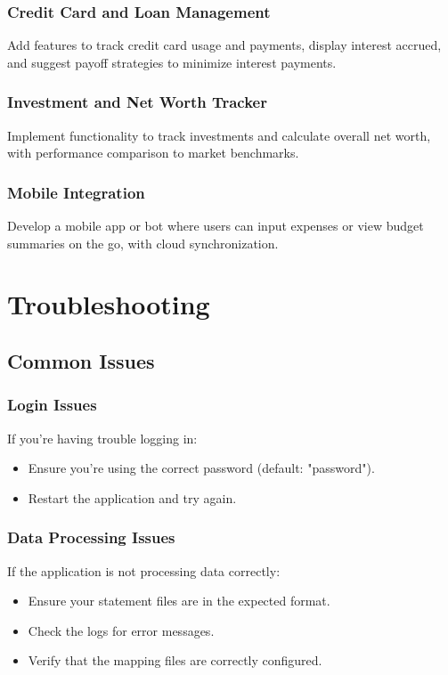 \documentclass[11pt,a4paper]{report}
\begin{document}
\subsection{Credit Card and Loan Management}
Add features to track credit card usage and payments, display interest accrued, and suggest payoff strategies to minimize interest payments.

\subsection{Investment and Net Worth Tracker}
Implement functionality to track investments and calculate overall net worth, with performance comparison to market benchmarks.

\subsection{Mobile Integration}
Develop a mobile app or bot where users can input expenses or view budget summaries on the go, with cloud synchronization.

\chapter{Troubleshooting}

\section{Common Issues}

\subsection{Login Issues}
If you're having trouble logging in:
\begin{itemize}
    \item Ensure you're using the correct password (default: "password").
    \item Restart the application and try again.
\end{itemize}

\subsection{Data Processing Issues}
If the application is not processing data correctly:
\begin{itemize}
    \item Ensure your statement files are in the expected format.
    \item Check the logs for error messages.
    \item Verify that the mapping files are correctly configured.
\end{itemize}
\end{document}
